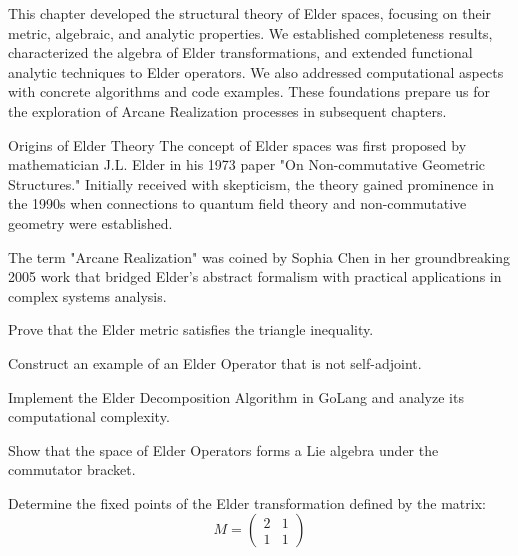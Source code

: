 \begin{chaptersummary}
This chapter developed the structural theory of Elder spaces, focusing on their metric, algebraic, and analytic properties. We established completeness results, characterized the algebra of Elder transformations, and extended functional analytic techniques to Elder operators. We also addressed computational aspects with concrete algorithms and code examples. These foundations prepare us for the exploration of Arcane Realization processes in subsequent chapters.
\end{chaptersummary}

\begin{historicalnote}{Origins of Elder Theory}
The concept of Elder spaces was first proposed by mathematician J.L. Elder in his 1973 paper "On Non-commutative Geometric Structures." Initially received with skepticism, the theory gained prominence in the 1990s when connections to quantum field theory and non-commutative geometry were established.

The term "Arcane Realization" was coined by Sophia Chen in her groundbreaking 2005 work that bridged Elder's abstract formalism with practical applications in complex systems analysis.
\end{historicalnote}

\begin{problemset}
\item Prove that the Elder metric satisfies the triangle inequality.
\item Construct an example of an Elder Operator that is not self-adjoint.
\item Implement the Elder Decomposition Algorithm in GoLang and analyze its computational complexity.
\item Show that the space of Elder Operators forms a Lie algebra under the commutator bracket.
\item Determine the fixed points of the Elder transformation defined by the matrix:
\begin{equation}
M = \begin{pmatrix}
2 & 1 \\
1 & 1
\end{pmatrix}
\end{equation}
\end{problemset}
